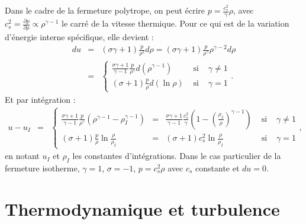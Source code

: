 Dans le cadre de la fermeture polytrope, on peut écrire $p = \frac{c_s^2}{\gamma} \rho$, avec $c^2_s = \frac{\partial p}{\partial \rho} \propto \rho^{\gamma-1}$ le carré de la vitesse thermique. Pour ce qui est de la variation d'énergie interne spécifique, elle devient :
\begin{eqnarray}
\label{eq:thermo_pol_du} d u &=& \left(\sigma \gamma+1\right) \frac{p}{\rho^2} d \rho =  \left(\sigma \gamma+1\right) \frac{p}{\rho^{\gamma}} \rho^{\gamma -2} d \rho \\
&=& \left\{ \begin{array}{lcl} \frac{\sigma \gamma+1}{\gamma-1} \frac{p}{\rho^{\gamma}} d\left( \rho^{\gamma-1} \right)  &\textrm{ si }&  \gamma \neq 1\\
\left(\sigma+1\right) \frac{p}{\rho} d \left(\ln{\rho}\right)  &\textrm{ si }&  \gamma = 1
\end{array} \right. .
\end{eqnarray}
Et par intégration :
\begin{eqnarray}
\label{eq:thermo_pol_u} u - u_I &=& \left\{ \begin{array}{lclcl} \frac{\sigma \gamma+1 }{\gamma-1} \frac{p}{\rho^{\gamma}} \left(\rho^{\gamma-1} - \rho_I^{\gamma-1}\right) &=& \frac{\sigma \gamma+1 }{\gamma-1} \frac{c_s^2}{\gamma} \left(1 - \left(\frac{\rho_I}{\rho}\right)^{\gamma-1}\right)  & \textrm{ si } & \gamma \neq 1\\
   \left(\sigma+1\right) \frac{p}{\rho} \ln \frac{\rho}{\rho_I} &=& \left(\sigma+1\right) c_s^2 \ln \frac{\rho}{\rho_I} &\textrm{ si }&  \gamma = 1 
   \end{array} \right. ,
\end{eqnarray} 
en notant $u_I$ et $\rho_I$ les constantes d'intégrations.
Dans le cas particulier de la fermeture isotherme, $\gamma = 1$, $\sigma = -1$, $p = c^2_s \rho$ avec $c_s$ constante et $du = 0$. 

\section{Thermodynamique et turbulence} \label{sec-112bis}

